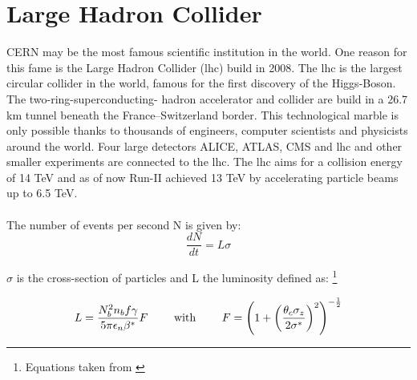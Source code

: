 \documentclass[../Bachelorarbeit.tex]{subfiles}
\begin{document}
\label{sec:LHC}
\section{Large Hadron Collider}
CERN may be the most famous scientific institution in the world. One reason for this fame is the Large Hadron Collider (\acrshort{lhc})\cite{Evans.2008} build in 2008. The \acrshort{lhc} is the largest circular collider in the world,
famous for the first discovery of the Higgs-Boson. The two-ring-superconducting- hadron accelerator and collider are build in a 26.7 km tunnel beneath the France–Switzerland border.
This technological marble is only possible thanks to thousands of engineers, computer scientists and physicists around the world.
Four large detectors ALICE, ATLAS, CMS and \acrshort{lhc} and other smaller experiments are connected to the \acrshort{lhc}.
The \acrshort{lhc} aims for a collision energy of 14 TeV and as of now Run-II achieved 13 TeV by accelerating particle beams up to 6.5 TeV.\\\\
The number of events per second N is given by:
\begin{equation}
    \frac{dN}{dt} = L \sigma
\end{equation}

$\sigma$ is the cross-section of particles and L the luminosity defined as:
\footnote{Equations taken from \cite{Evans.2008}}

\begin{equation}
    L= \frac{N_{b}^{2} n_{b} f \gamma}{5 \pi \epsilon_{n} \beta^{*}} F \qquad \textnormal{ with } \qquad  F=\left( 1 + \left( \frac{\theta_{c} \sigma_{z}}{2 \sigma^{*}}\right)^{2} \right)^{-\frac{1}{2}}
\end{equation}
\end{document}
